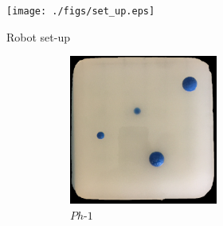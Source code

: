 \begin{figure}[]
	\centering
	\begin{subfigure}[b]{.448\textwidth}
		\centering
		\texttt{[image: ./figs/set\_up.eps]}
		\caption{Robot set-up}
		\label{exp:robot}
	\end{subfigure}
	\hspace{0.01\textwidth}
	\begin{subfigure}[b]{0.53\textwidth}
		\begin{subfigure}[b]{\textwidth}
			\centering
			\begin{subfigure}[b]{.45\textwidth}
				\includegraphics[width=\textwidth]{./figs/phantom.jpg}
				\caption{$Ph\text{-}1$}
				\label{ph1}
			\end{subfigure}
			\hspace{0.01\textwidth}
			\begin{subfigure}[b]{.46\textwidth}

\end{subfigure}
\end{subfigure}
\end{subfigure}
\end{figure}
